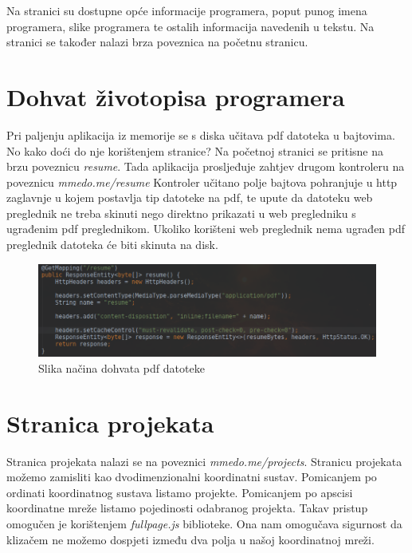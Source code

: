 \documentclass[times, utf8, zavrsni, numeric]{fer}
\begin{document}
Na stranici su dostupne opće informacije programera, poput punog imena programera, slike programera te ostalih informacija navedenih u tekstu.
Na stranici se također nalazi brza poveznica na početnu stranicu.

\section{Dohvat životopisa programera}
\qquad Pri paljenju aplikacija iz memorije se s diska učitava pdf datoteka u bajtovima.
No kako doći do nje korištenjem stranice?
Na početnoj stranici se pritisne na brzu poveznicu \textit{resume}.
Tada aplikacija prosljeđuje zahtjev drugom kontroleru na poveznicu \textit{mmedo.me/resume} 
Kontroler učitano polje bajtova pohranjuje u http zaglavnje u kojem postavlja tip datoteke na pdf, te upute da datoteku web preglednik ne treba skinuti nego direktno prikazati u web pregledniku s ugrađenim pdf preglednikom.
Ukoliko korišteni web preglednik nema ugrađen pdf preglednik datoteka će biti skinuta na disk.

\begin{figure}[htb]
				\centering
				\includegraphics[width=14.6cm]{images/resume.png}
				\caption{Slika načina dohvata pdf datoteke}
				\label{fig:resume}
\end{figure}

\section{Stranica projekata}
\qquad Stranica projekata nalazi se na poveznici \textit{mmedo.me/projects}.
Stranicu projekata možemo zamisliti kao dvodimenzionalni koordinatni sustav.
Pomicanjem po ordinati koordinatnog sustava listamo projekte.
Pomicanjem po apscisi koordinatne mreže listamo pojedinosti odabranog projekta.
Takav pristup omogučen je korištenjem \textit{fullpage.js} biblioteke.
Ona nam omogučava sigurnost da klizačem ne možemo dospjeti između dva polja u našoj koordinatnoj mreži.
\end{document}
